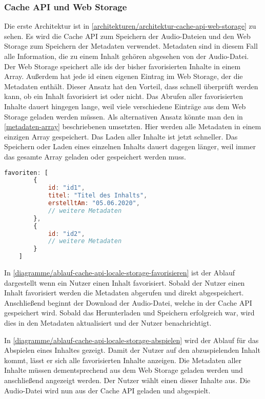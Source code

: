 \subsubsection{Cache API und Web Storage}
Die erste Architektur ist in \autoref{architekturen/architektur-cache-api-web-storage} zu sehen. Es wird die Cache \ac{API} zum Speichern der Audio-Dateien und den Web Storage zum Speichern der Metadaten verwendet. Metadaten sind in diesem Fall alle Information, die zu einem Inhalt gehören abgesehen von der Audio-Datei. Der Web Storage speichert alle ids der bisher favorisierten Inhalte in einem Array. Außerdem hat jede id einen eigenen Eintrag im Web Storage, der die Metadaten enthält. Dieser Ansatz hat den Vorteil, dass schnell überprüft werden kann, ob ein Inhalt favorisiert ist oder nicht. Das Abrufen aller favorisierten Inhalte dauert hingegen lange, weil viele verschiedene Einträge aus dem Web Storage geladen werden müssen. Als alternativen Ansatz könnte man den in \autoref{metadaten-array} beschriebenen umsetzten. Hier werden alle Metadaten in einem einzigen Array gespeichert. Das Laden aller Inhalte ist jetzt schneller. Das Speichern oder Laden eines einzelnen Inhalts dauert dagegen länger, weil immer das gesamte Array geladen oder gespeichert werden muss.


\begin{lstlisting}[language=JavaScript,caption={Speichern der Metadaten in einem Array},label={metadaten-array}]
    favoriten: [
    	{
    		id: "id1",
    		titel: "Titel des Inhalts",
    		erstelltAm: "05.06.2020",
    		// weitere Metadaten
    	},
    	{
    		id: "id2",
    		// weitere Metadaten
    	}
    ]
\end{lstlisting}

In \autoref{diagramme/ablauf-cache-api-locale-storage-favorisieren} ist der Ablauf dargestellt wenn ein Nutzer einen Inhalt favorisiert. Sobald der Nutzer einen Inhalt favorisiert werden die Metadaten abgerufen und direkt abgespeichert. Anschließend beginnt der Download der Audio-Datei, welche in der Cache \ac{API} gespeichert wird. Sobald das Herunterladen und Speichern erfolgreich war, wird dies in den Metadaten aktualisiert und der Nutzer benachrichtigt.


In \autoref{diagramme/ablauf-cache-api-locale-storage-abspielen} wird der Ablauf für das Abspielen eines Inhaltes gezeigt. Damit der Nutzer auf den abzuspielenden Inhalt kommt, lässt er sich alle favorisierten Inhalte anzeigen. Die Metadaten aller Inhalte müssen dementsprechend aus dem Web Storage geladen werden und anschließend angezeigt werden. Der Nutzer wählt einen dieser Inhalte aus. Die Audio-Datei wird nun aus der Cache \ac{API} geladen und abgespielt.

